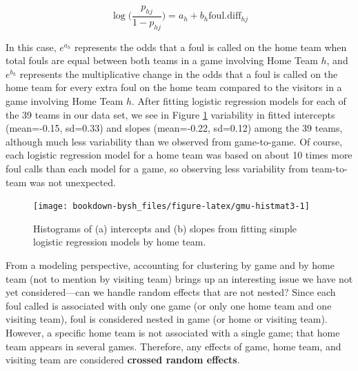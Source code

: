 \documentclass[
]{krantz}
\begin{document}
\begin{equation}
\log\bigg(\frac{p_{hj}}{1-p_{hj}}\bigg)=a_h+b_h\mathrm{foul.diff}_{hj}
\label{eq:lev1bglmm}
\end{equation}

In this case, \(e^{a_{h}}\) represents the odds that a foul is called on the home team when total fouls are equal between both teams in a game involving Home Team \(h\), and \(e^{b_{h}}\) represents the multiplicative change in the odds that a foul is called on the home team for every extra foul on the home team compared to the visitors in a game involving Home Team \(h\). After fitting logistic regression models for each of the 39 teams in our data set, we see in Figure \ref{fig:gmu-histmat3} variability in fitted intercepts (mean=-0.15, sd=0.33) and slopes (mean=-0.22, sd=0.12) among the 39 teams, although much less variability than we observed from game-to-game. Of course, each logistic regression model for a home team was based on about 10 times more foul calls than each model for a game, so observing less variability from team-to-team was not unexpected.

\begin{figure}

{\centering \texttt{[image: bookdown-bysh\_files/figure-latex/gmu-histmat3-1]} 

}

\caption{Histograms of (a) intercepts and (b) slopes from fitting simple logistic regression models by home team.}\label{fig:gmu-histmat3}
\end{figure}

From a modeling perspective, accounting for clustering by game and by home team (not to mention by visiting team) brings up an interesting issue we have not yet considered---can we handle random effects that are not nested? Since each foul called is associated with only one game (or only one home team and one visiting team), foul is considered nested in game (or home or visiting team). However, a specific home team is not associated with a single game; that home team appears in several games. Therefore, any effects of game, home team, and visiting team are considered \textbf{crossed random effects}.
\end{document}
